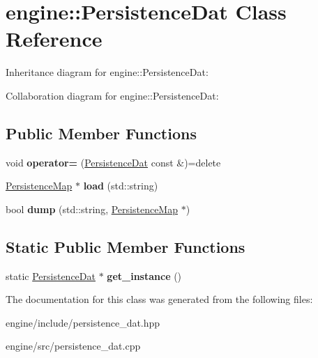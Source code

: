 \hypertarget{classengine_1_1_persistence_dat}{}\section{engine\+:\+:Persistence\+Dat Class Reference}
\label{classengine_1_1_persistence_dat}


Inheritance diagram for engine\+:\+:Persistence\+Dat\+:


Collaboration diagram for engine\+:\+:Persistence\+Dat\+:
\subsection*{Public Member Functions}
\begin{DoxyCompactItemize}
\item 
void {\bfseries operator=} (\hyperlink{classengine_1_1_persistence_dat}{Persistence\+Dat} const \&)=delete\hypertarget{classengine_1_1_persistence_dat_a207058814fa0d5cf6ab693eb6c2bcd58}{}\label{classengine_1_1_persistence_dat_a207058814fa0d5cf6ab693eb6c2bcd58}

\item 
\hyperlink{classengine_1_1_persistence_map}{Persistence\+Map} $\ast$ {\bfseries load} (std\+::string)\hypertarget{classengine_1_1_persistence_dat_afd72460731bf0fab23f002ad0c895925}{}\label{classengine_1_1_persistence_dat_afd72460731bf0fab23f002ad0c895925}

\item 
bool {\bfseries dump} (std\+::string, \hyperlink{classengine_1_1_persistence_map}{Persistence\+Map} $\ast$)\hypertarget{classengine_1_1_persistence_dat_a967c33fc78f68fb756b6d730f2fc38e0}{}\label{classengine_1_1_persistence_dat_a967c33fc78f68fb756b6d730f2fc38e0}

\end{DoxyCompactItemize}
\subsection*{Static Public Member Functions}
\begin{DoxyCompactItemize}
\item 
static \hyperlink{classengine_1_1_persistence_dat}{Persistence\+Dat} $\ast$ {\bfseries get\+\_\+instance} ()\hypertarget{classengine_1_1_persistence_dat_a10d573b0dc2ac097d53b2e445625fe6f}{}\label{classengine_1_1_persistence_dat_a10d573b0dc2ac097d53b2e445625fe6f}

\end{DoxyCompactItemize}


The documentation for this class was generated from the following files\+:\begin{DoxyCompactItemize}
\item 
engine/include/persistence\+\_\+dat.\+hpp\item 
engine/src/persistence\+\_\+dat.\+cpp\end{DoxyCompactItemize}

